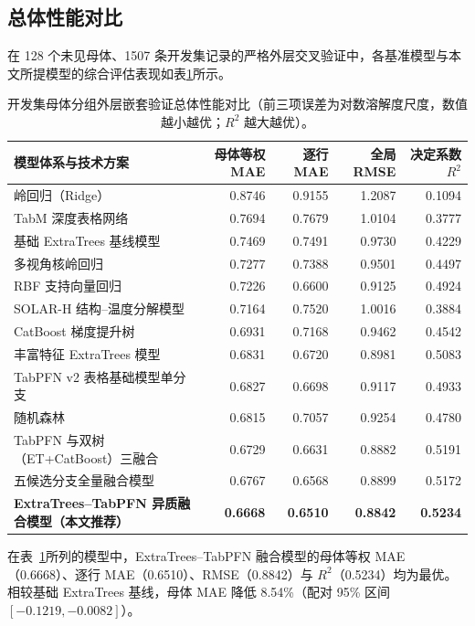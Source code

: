 \subsection{总体性能对比}\label{sec:prediction_results}

在 128 个未见母体、1507 条开发集记录的严格外层交叉验证中，各基准模型与本文所提模型的综合评估表现如表\ref{tab:v2_main_metrics}所示。

\begin{table}[htbp]
\centering
\small
\caption{开发集母体分组外层嵌套验证总体性能对比（前三项误差为对数溶解度尺度，数值越小越优；$R^2$ 越大越优）。}
\label{tab:v2_main_metrics}
\begin{tabular}{lrrrr}
\toprule
模型体系与技术方案 & 母体等权 MAE & 逐行 MAE & 全局 RMSE & 决定系数 $R^2$ \\
\midrule
岭回归（Ridge） & 0.8746 & 0.9155 & 1.2087 & 0.1094 \\
TabM 深度表格网络 & 0.7694 & 0.7679 & 1.0104 & 0.3777 \\
基础 ExtraTrees 基线模型 & 0.7469 & 0.7491 & 0.9730 & 0.4229 \\
多视角核岭回归 & 0.7277 & 0.7388 & 0.9501 & 0.4497 \\
RBF 支持向量回归 & 0.7226 & 0.6600 & 0.9125 & 0.4924 \\
SOLAR-H 结构--温度分解模型 & 0.7164 & 0.7520 & 1.0016 & 0.3884 \\
CatBoost 梯度提升树 & 0.6931 & 0.7168 & 0.9462 & 0.4542 \\
丰富特征 ExtraTrees 模型 & 0.6831 & 0.6720 & 0.8981 & 0.5083 \\
TabPFN v2 表格基础模型单分支 & 0.6827 & 0.6698 & 0.9117 & 0.4933 \\
随机森林 & 0.6815 & 0.7057 & 0.9254 & 0.4780 \\
\midrule
TabPFN 与双树（ET+CatBoost）三融合 & 0.6729 & 0.6631 & 0.8882 & 0.5191 \\
五候选分支全量融合模型 & 0.6767 & 0.6568 & 0.8899 & 0.5172 \\
\textbf{ExtraTrees--TabPFN 异质融合模型（本文推荐）} & \textbf{0.6668} & \textbf{0.6510} & \textbf{0.8842} & \textbf{0.5234} \\
\bottomrule
\end{tabular}
\end{table}

在表~\ref{tab:v2_main_metrics}所列的模型中，ExtraTrees--TabPFN 融合模型的母体等权 MAE（0.6668）、逐行 MAE（0.6510）、RMSE（0.8842）与 $R^2$（0.5234）均为最优。相较基础 ExtraTrees 基线，母体 MAE 降低 8.54\%（配对 95\% 区间 $[-0.1219, -0.0082]$）。

